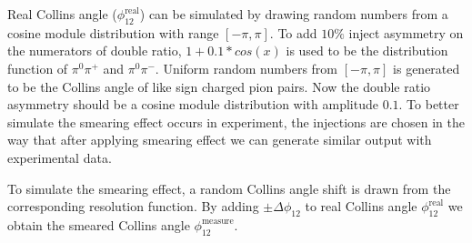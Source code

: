 Real Collins angle ($\phi_{12}^{\text{real}}$) can be simulated by drawing random numbers from a cosine module distribution with range $[-\pi,\pi]$. To add $10\%$ inject asymmetry on the numerators of double ratio, $1+0.1*cos(x)$ is used to be the distribution function of $\pi^0\pi^+$ and $\pi^0\pi^-$. Uniform random numbers from $[-\pi,\pi]$ is generated to be the Collins angle of like sign charged pion pairs. Now the double ratio asymmetry should be a cosine module distribution with amplitude $0.1$. To better simulate the smearing effect occurs in experiment, the injections are chosen in the way that after applying smearing effect we can generate similar output with experimental data.

To simulate the smearing effect, a random Collins angle shift is drawn from the corresponding resolution function. By adding $\pm\Delta\phi_{12}$ to real Collins angle $\phi_{12}^{\text{real}}$ we obtain the smeared Collins angle $\phi_{12}^{\text{measure}}$. 

